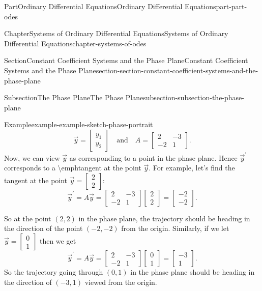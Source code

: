 \documentclass[twoside,10pt,]{book}
\numberwithin{equation}{part}
\begin{document}
\begin{partptx}{Part}{Ordinary Differential Equations}{}{Ordinary Differential Equations}{}{}{part-part-odes}
\begin{chapterptx}{Chapter}{Systems of Ordinary Differential Equations}{}{Systems of Ordinary Differential Equations}{}{}{chapter-systems-of-odes}
\begin{sectionptx}{Section}{Constant Coefficient Systems and the Phase Plane}{}{Constant Coefficient Systems and the Phase Plane}{}{}{section-section-constant-coefficient-systems-and-the-phase-plane}
\begin{subsectionptx}{Subsection}{The Phase Plane}{}{The Phase Plane}{}{}{subsection-subsection-the-phase-plane}
\begin{example}{Example}{}{example-example-sketch-phase-portrait}
\begin{equation*}
\vec{y} = \begin{bmatrix}y_{1}\\y_{2}\end{bmatrix}\quad\text{and}\quad A = \begin{bmatrix}2 &  -3 \\-2 &  1\end{bmatrix}.
\end{equation*}
Now, we can view \(\vec{y}\) as corresponding to a point in the phase plane. Hence \(\vec{y}^\prime\) corresponds to a \textbackslash{}emph\textbraceleft{}tangent\textbraceright{} at the point \(\vec{y}\). For example, let's find the tangent at the point \(\vec{y} = \begin{bmatrix}2\\2\end{bmatrix}\):%
\begin{equation*}
\vec{y}^\prime = A\vec{y} = \begin{bmatrix}2 &  -3 \\ -2 &  1\end{bmatrix}\begin{bmatrix}2\\2\end{bmatrix} = \begin{bmatrix}-2 \\ -2\end{bmatrix}.
\end{equation*}
%
\par
So at the point \((2,2)\) in the phase plane, the trajectory should be heading in the direction of the point \((-2,-2)\) from the origin. Similarly, if we let \(\vec{y} = \begin{bmatrix}0\\1\end{bmatrix}\) then we get%
\begin{equation*}
\vec{y}^\prime = A\vec{y} = \begin{bmatrix}2 &  -3 \\ -2 &  1\end{bmatrix}\begin{bmatrix}0\\1\end{bmatrix} = \begin{bmatrix}-3 \\ 1\end{bmatrix}.
\end{equation*}
So the trajectory going through \((0,1)\) in the phase plane should be heading in the direction of \((-3,1)\) viewed from the origin.%

\end{example}
\end{subsectionptx}
\end{sectionptx}
\end{chapterptx}
\end{partptx}
\end{document}
